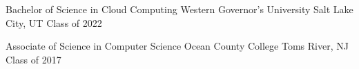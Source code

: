 

\begin{cventries}

	\cventry
	{Bachelor of Science in Cloud Computing} %
	{Western Governor's University} %
	{Salt Lake City, UT} %
	{Class of 2022} %
	{
		\begin{cvitems} %
		\end{cvitems}
	}

	\cventry
	{Associate of Science in Computer Science} %
	{Ocean County College} %
	{Toms River, NJ} %
	{Class of 2017} %
	{
		\begin{cvitems} %
		\end{cvitems}
	}


\end{cventries}

